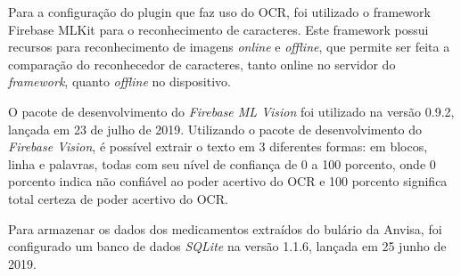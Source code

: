 Para a configuração do plugin que faz uso do OCR, foi utilizado o framework Firebase MLKit para o reconhecimento de caracteres. Este framework possui recursos para reconhecimento de imagens
\textit{online} e \textit{offline},
que permite ser feita a comparação do reconhecedor de caracteres, tanto online no servidor do \textit{framework}, quanto \textit{offline} no dispositivo.

O pacote de desenvolvimento do \textit{Firebase ML Vision} foi utilizado na versão 0.9.2, lançada em 23 de julho de 2019.	Utilizando o pacote de desenvolvimento do \textit{Firebase Vision}, é possível extrair o texto em 3 diferentes formas: em blocos, linha e palavras, todas com seu nível de confiança de 0 a 100 porcento, onde 0 porcento indica não confiável ao poder acertivo do OCR e 100 porcento significa total certeza de poder acertivo do OCR.
 
 Para armazenar os dados dos medicamentos extraídos do bulário da Anvisa, foi configurado um banco de dados \textit{SQLite} na versão 1.1.6, lançada em 25 junho de 2019. 










